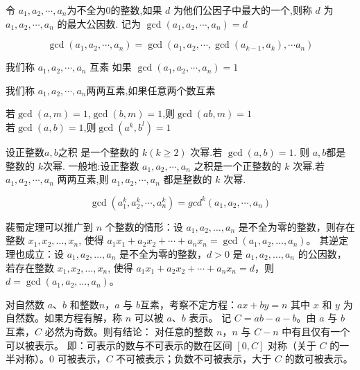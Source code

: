 \begin{definition}
  令 $a_1,a_2,\cdots ,a_n$为不全为0的整数,如果 $d$
 为他们公因子中最大的一个,则称 $d$
 为 $a_1,a_2,\cdots ,a_n$ 的最大公因数.
记为
  $ \gcd(a_1,a_2,\cdots ,a_n)=d$

\end{definition}

\begin{theorem}
$$
\gcd(a_1,a_2,\cdots ,a_n)=\gcd(a_1,a_2,\cdots, \gcd(a_{k-1},a_k),\cdots a_n)
$$
\end{theorem}


\begin{definition}
  我们称 $a_1,a_2,\cdots ,a_n $ 互素 如果 $ \gcd(a_1,a_2,\cdots ,a_n)=1$
\end{definition}

\begin{definition}
  我们称 $a_1,a_2,\cdots ,a_n $两两互素,如果任意两个数互素
\end{definition}

\begin{theorem}
  若$\gcd(a,m)=1$,$\gcd(b,m)=1$,则$\gcd(ab,m)=1$\\
  若$\gcd(a,b)=1$,则$\gcd(a^k,b^l)=1$
\end{theorem}

\begin{theorem}
  设正整数$a,b$之积 是一个整数的 $k(k\ge 2)$ 次幂.若
  $\gcd(a,b)=1$. 则 $a,b$都是整数的  $k$次幂.
  一般地:设正整数 $ a_1,a_2,\cdots ,a_n $ 之积是一个正整数的 $k$ 次幂.若 
  $a_1,a_2,\cdots ,a_n$ 两两互素,则 $a_1,a_2,\cdots ,a_n$
 都是整数的 $k$
 次幂.
\end{theorem}

\begin{lemma}
$$
\gcd(a_1^k,a_2^k,\cdots ,a_n^k)=gcd^k(a_1,a_2,\cdots ,a_n)
$$
\end{lemma}


\begin{corollary}
  裴蜀定理可以推广到 $n$ 个整数的情形：设 $a_1, a_2, \dots, a_n$
   是不全为零的整数，则存在整数 $x_1, x_2, \dots, x_n$, 使得 $a_1 x_1 + a_2 x_2 + \cdots + a_n x_n=\gcd(a_1, a_2, \dots, a_n)$。
   其逆定理也成立：设 $a_1, a_2, \dots, a_n$ 是不全为零的整数，$d > 0$ 是 $a_1, a_2, \dots, a_n$ 的公因数，
   若存在整数 $x_1, x_2, \dots, x_n$, 使得 $a_1 x_1 + a_2 x_2 + \cdots + a_n x_n=d$，则 $d = \gcd(a_1, a_2, \dots, a_n)$。
\end{corollary}

\begin{corollary}
  对自然数 $a、b$ 和整数$ n，a$ 与 $b $互素，考察不定方程：$ax+by=n$
 其中 $x$ 和 $y$ 为自然数。如果方程有解，称 $n$ 可以被 $a、b$ 表示。
 记 $C=ab-a-b$。由 $a$ 与 $b$ 互素，$C$ 必然为奇数。则有结论：
对任意的整数 $n$，$n$ 与 $C-n$ 中有且仅有一个可以被表示。
即：可表示的数与不可表示的数在区间 $[0,C]$ 对称（关于 $C$ 的一半对称）。$0$ 可被表示，$C$ 不可被表示；负数不可被表示，大于 $C$ 的数可被表示。
\end{corollary}

